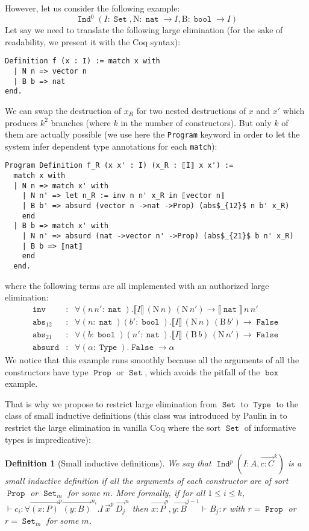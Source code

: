 \documentclass[a4paper,USenglish]{lipics}
\newtheorem{dfn}{Definition}
\DeclareMathOperator{\Prop}{\mathtt{Prop}}
\DeclareMathOperator{\Type}{\mathtt{Type}}
\DeclareMathOperator{\Set}{\mathtt{Set}}
\DeclareMathOperator{\Ind}{\mathtt{Ind}}
\DeclareMathOperator{\Boxy}{\mathtt{box}}
\DeclareMathOperator{\Nat}{\mathtt{nat}}
\DeclareMathOperator{\Bool}{\mathtt{bool}}
\DeclareMathOperator{\False}{\mathtt{False}}
\def\coq{\textsf{Coq}\xspace}
\newcommand{\arrlong}[1]{\overrightarrow{#1}}
\newcommand\arn[2]{
{\arrlong{#1}}^{#2}
}
\begin{document}
However, let us consider the following example:
$$\Ind^0 (I : \Set, \mathrm{N} : \Nat \to I, \mathrm{B} : \Bool \to I)$$
Let say we need to translate the following large elimination (for the
sake of readability, we present it with the \coq syntax):
\begin{lstlisting}
Definition f (x : I) := match x with
  | N n => vector n
  | B b => nat
end.
\end{lstlisting}
We can swap the destruction of $x_R$ for two nested destructions of
$x$ and $x'$ which produces $k^2$ branches (where $k$ in the number of constructors). But only $k$ of them are actually possible
(we use here the \texttt{Program} keyword in order to let the system infer dependent type annotations for each \texttt{match}):
\begin{lstlisting}
Program Definition f_R (x x' : I) (x_R : ⟦I⟧ x x') :=
  match x with
  | N n => match x' with
    | N n' => let n_R := inv n n' x_R in ⟦vector n⟧
    | B b' => absurd (vector n ->nat ->Prop) (abs$_{12}$ n b' x_R)
    end
  | B b => match x' with
    | N n' => absurd (nat ->vector n' ->Prop) (abs$_{21}$ b n' x_R)
    | B b => ⟦nat⟧
    end
  end.
\end{lstlisting}
where the following terms are all implemented with an authorized large
elimination:
\begin{eqnarray*}
  \texttt{inv} & :& ∀ (n\,n' : \Nat). ⟦I⟧\,(\mathrm{N}\,n)\,(\mathrm{N}\,n') → ⟦\Nat⟧\,n\,n'\\
  \texttt{abs}_{12} & :&  ∀ (n : \Nat) (b' : \Bool). ⟦I⟧\,(\mathrm{N}\,n)\,(\mathrm{B}\, b') → \False \\
  \texttt{abs}_{21} & :&  ∀ (b : \Bool) (n' : \Nat).  ⟦I⟧\,(\mathrm{B}\,b)\,(\mathrm{N}\, n') → \False \\
  \texttt{absurd} & :& ∀ (α : \Type).\False → α
\end{eqnarray*}
We notice that this example runs smoothly because all the arguments of
all the constructors have type $\Prop$ or $\Set$, which avoids the
pitfall of the $\Boxy$ example.

That is why we propose to restrict large elimination from $\Set$ to
$\Type$ to the class of small inductive definitions (this class was
introduced by Paulin in \cite{springerlink:10.1007/BFb0037116} to
restrict the large elimination in vanilla \coq where the sort $\Set$ of
informative types is impredicative):
\begin{dfn}[Small inductive definitions]
 We say that $\Ind^p(I:A, \arn{c : C}{k})$ is a \emph{small
 inductive definition} if all the arguments of each constructor
 are of sort $\Prop$ or $\Set_m$ for some $m$. More formally,
 if for all $1 \leq i \leq k$,
$⊢ c_i : ∀\arn{(x:P)}{p}\arn{(y:B)}{n_i}.I\,\arn{x}{p}\,\arn{D_j}{n}$
 then $\arn{x:P}{p},\arn{y:B}{j-1} ⊢ B_j : r$ with $r = \Prop$ or
 $r = \Set_m$ for some $m$.
\end{dfn}
\end{document}
